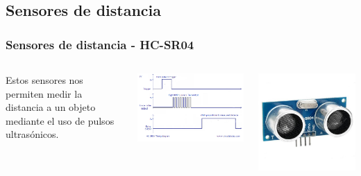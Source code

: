 \documentclass[compress]{beamer}
\begin{document}
\subsection{Sensores de distancia}

\begin{frame}[fragile]
 \frametitle{Sensores de distancia - HC-SR04}
\begin{columns}
Estos sensores nos permiten medir la distancia a un objeto mediante el uso de pulsos ultrasónicos.
\begin{center}
 \includegraphics[width=1.0\columnwidth]{./img/hc-sr04-timing-diagram.png}
\end{center}
\begin{center}
 \includegraphics[width=1.0\columnwidth]{./img/hc-sr04.jpg}
\end{center}
\end{columns}
\end{frame}
\end{document}
